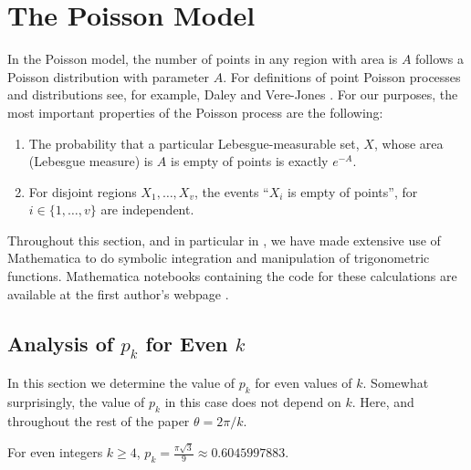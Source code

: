 \documentclass{patmorin}
\begin{document}
\section{The Poisson Model}

In the Poisson model, the number of points in any region with area is $A$
follows a Poisson distribution with parameter $A$.  For definitions of
point Poisson processes and distributions see, for example, Daley and
Vere-Jones \cite[Chapter~2]{daley.vere-jones:introduction}.  For our
purposes, the most important properties of the Poisson process are
the following:
\begin{enumerate}
\item The probability that a particular Lebesgue-measurable set, $X$,
   whose area (Lebesgue measure) is $A$ is empty of points is exactly
   $e^{-A}$.
\item For disjoint regions $X_1,\ldots,X_v$, the events ``$X_i$ is empty
   of points'', for $i\in\{1,\ldots,v\}$ are independent.
\end{enumerate}

Throughout this section, and in particular in , we have made
extensive use of Mathematica to do symbolic integration and manipulation
of trigonometric functions.  Mathematica notebooks containing the code
for these calculations are available at the first author's webpage \cite{morin:avgtheta}.

\subsection{Analysis of $p_k$ for Even $k$}

In this section we determine the value of $p_k$ for even values of $k$.
Somewhat surprisingly, the value of $p_k$ in this case does not depend on $k$.
Here, and throughout the rest of the paper $\theta=2\pi/k$.

\begin{lem}
 For even integers $k\ge 4$, $p_k=\frac{\pi\sqrt{3}}{9}\approx 0.6045997883$.
\end{lem}
\end{document}
